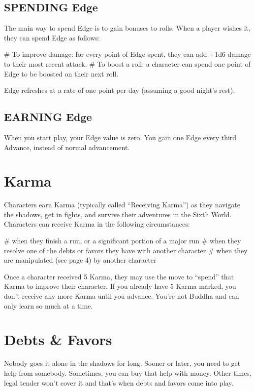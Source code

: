 \subsection{SPENDING Edge}
The main way to spend Edge is to gain bonuses to rolls. When a player wishes it, they can spend Edge as follows:

\begin{easylist}
# To improve damage: for every point of Edge spent, they can add +1d6 damage to their most recent attack.
# To boost a roll: a character can spend one point of Edge to be boosted on their next roll.    
\end{easylist}

Edge refreshes at a rate of one point per day (assuming a good night’s rest).

\subsection{EARNING Edge}
When you start play, your Edge value is zero. You gain one Edge every third Advance, instead of normal advancement.


\section{Karma}

Characters earn Karma (typically called ``Receiving Karma'') as they navigate the shadows, get in fights, and survive their adventures in the Sixth World. Characters can receive Karma in the following circumstances:

\begin{easylist}
# when they finish a run, or a significant portion of a major run
# when they resolve one of the debts or favors they have with another character
# when they are manipulated (see page 4) by another character
\end{easylist}

Once a character received 5 Karma, they may use the  move to ``spend'' that Karma to improve their character. If you already have 5 Karma marked, you don’t receive any more Karma until you advance. You're not Buddha and can only learn so much at a time.


\section{Debts \& Favors}

Nobody goes it alone in the shadows for long. Sooner or later, you need to get help from somebody. Sometimes, you can buy that help with money. Other times, legal tender won’t cover it and that’s when debts and favors come into play.

